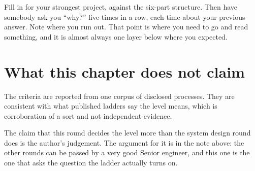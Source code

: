 \begin{drill}
Fill in  for your strongest project,
against the six-part structure. Then have somebody ask you ``why?'' five times
in a row, each time about your previous answer. Note where you run out. That
point is where you need to go and read something, and it is almost always one
layer below where you expected.
\end{drill}

\section*{What this chapter does not claim}

The criteria are reported from one corpus of disclosed processes. They are
consistent with what published ladders say the level means, which is corroboration
of a sort and not independent evidence.

The claim that this round decides the level more than the system design round
does is the author's judgement. The argument for it is in the note above: the
other rounds can be passed by a very good Senior engineer, and this one is the
one that asks the question the ladder actually turns on.
